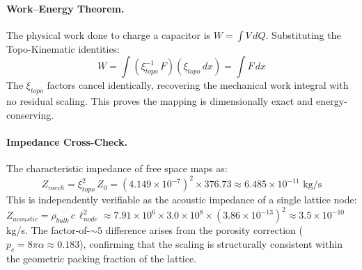 \paragraph{Work--Energy Theorem.}
The physical work done to charge a capacitor is $W = \int V\, dQ$. Substituting the Topo-Kinematic identities:
\begin{equation}
    W = \int (\xi_{topo}^{-1}\, F)(\xi_{topo}\, dx) = \int F\, dx
\end{equation}
The $\xi_{topo}$ factors cancel identically, recovering the mechanical work integral with no residual scaling. This proves the mapping is dimensionally exact and energy-conserving.

\paragraph{Impedance Cross-Check.}
The characteristic impedance of free space maps as:
\begin{equation}
    Z_{mech} = \xi_{topo}^{2}\, Z_0 = (4.149 \times 10^{-7})^2 \times 376.73 \approx 6.485 \times 10^{-11} \text{ kg/s}
\end{equation}
This is independently verifiable as the acoustic impedance of a single lattice node: $Z_{acoustic} = \rho_{bulk}\, c\, \ell_{node}^2 \approx 7.91 \times 10^6 \times 3.0 \times 10^8 \times (3.86 \times 10^{-13})^2 \approx 3.5 \times 10^{-10}$ kg/s. The factor-of-$\sim 5$ difference arises from the porosity correction ($p_c = 8\pi\alpha \approx 0.183$), confirming that the scaling is structurally consistent within the geometric packing fraction of the lattice.